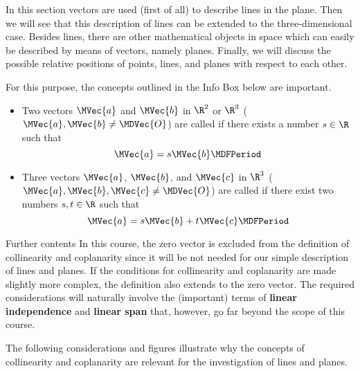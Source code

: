 \begin{MIntro}

In this section vectors are used (first of all) to describe lines in the plane. Then we will see that 
this description of lines can be extended to the three-dimensional case. Besides lines, there are other mathematical objects in space which can easily be 
described by means of vectors, namely planes. Finally, we will discuss the possible relative positions of points, 
lines, and planes with respect to each other.
 
For this purpose, the concepts outlined in the Info Box below are important.

\begin{MInfo}
\begin{itemize}
 \item Two vectors $\MVec{a}$ and $\MVec{b}$ in $\R^2$ or $\R^3$ ($\MVec{a},\MVec{b}\neq\MDVec{O}$) are called 
   if there exists a number $s\in\R$ such that
 \[
  \MVec{a}=s\MVec{b}\MDFPeriod
 \]
 \item Three vectors $\MVec{a}$, $\MVec{b}$, and $\MVec{c}$ in $\R^3$ ($\MVec{a},\MVec{b},\MVec{c}\neq\MDVec{O}$) 
  are called  if there exist two numbers $s,t\in\R$ such that
 \[
  \MVec{a}=s\MVec{b}+t\MVec{c}\MDFPeriod
 \]
\end{itemize}
\end{MInfo}

\begin{MHint}{Further contents}
In this course, the zero vector is excluded from the definition of collinearity and coplanarity
since it will be not needed for our simple description of lines and planes. If the conditions 
for collinearity and coplanarity are made slightly more complex, the definition also extends 
to the zero vector. The required considerations will naturally involve the (important) terms of 
\textbf{linear independence} and \textbf{linear span} that, however, go far beyond the scope of this 
course. 
\end{MHint}

The following considerations and figures illustrate why the concepts of collinearity and coplanarity
are relevant for the investigation of lines and planes.


\end{MIntro}
